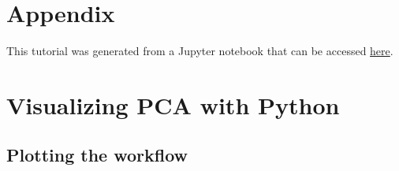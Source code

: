 \documentclass[10pt,twocolumn]{article}
\begin{document}
%
%
%
%
%
%
%
%
%
%

\newpage

\section*{Appendix}

\appendix

This tutorial was generated from a Jupyter notebook that can be accessed \href{https://github.com/kamilazdybal/ulb-atm-phd/blob/master/PCA/PCA-tutorial.ipynb}{here}.

\section{Visualizing PCA with Python}

\subsection{Plotting the workflow}\label{sec:pca-workflow}
\end{document}
